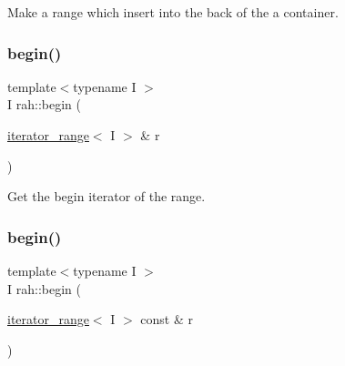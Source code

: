 Make a range which insert into the back of the a container. 


\begin{DoxyCodeInclude}{0}
\end{DoxyCodeInclude}
\mbox{\label{namespacerah_a2c4a19e57cc4e0753e93830f247def6d}} 
\subsubsection{\texorpdfstring{begin()}{begin()}\hspace{0.1cm}{\footnotesize\ttfamily [1/2]}}
{\footnotesize\ttfamily template$<$typename I $>$ \\
I rah\+::begin (\begin{DoxyParamCaption}\item[{\mbox{\hyperlink{structrah_1_1iterator__range}{iterator\+\_\+range}}$<$ I $>$ \&}]{r }\end{DoxyParamCaption})}



Get the begin iterator of the range. 

\mbox{\label{namespacerah_a14e69321e6772651b349cb31467ea3a2}} 
\subsubsection{\texorpdfstring{begin()}{begin()}\hspace{0.1cm}{\footnotesize\ttfamily [2/2]}}
{\footnotesize\ttfamily template$<$typename I $>$ \\
I rah\+::begin (\begin{DoxyParamCaption}\item[{\mbox{\hyperlink{structrah_1_1iterator__range}{iterator\+\_\+range}}$<$ I $>$ const \&}]{r }\end{DoxyParamCaption})}



